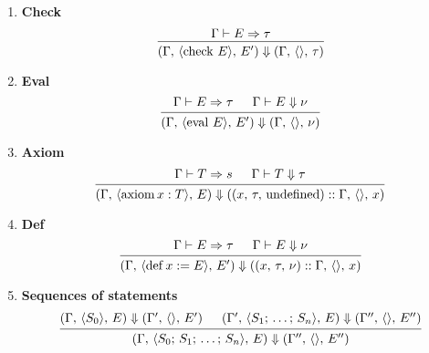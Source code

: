 \documentclass{article}
\begin{document}
\begin{enumerate}
\item \textbf{Check} \\
  \[
    \begin{prooftree}
      \hypo{\Gamma \vdash E \Rightarrow \tau}
      \infer1{(\Gamma, \, \langle \checkk \, E \rangle, \, E') \Downarrow
        (\Gamma, \, \langle \rangle, \, \tau)}
    \end{prooftree}
  \]

\item \textbf{Eval} \\
  \[
    \begin{prooftree}
      \hypo{\Gamma \vdash E \Rightarrow \tau}
      \hypo{\Gamma \vdash E \Downarrow \nu}
      \infer2{(\Gamma, \, \langle \evall \, E \rangle, \, E') \Downarrow
        (\Gamma, \, \langle \rangle, \, \nu)}
    \end{prooftree}
  \]

\item \textbf{Axiom} \\
  \[
    \begin{prooftree}
      \hypo{\Gamma \vdash T \Rightarrow s}
      \hypo{\Gamma \vdash T \Downarrow \tau}
      \infer2{(\Gamma, \, \langle \axiom x : T \rangle, \, E) \Downarrow
        ((x, \, \tau, \, \text{undefined}) :: \Gamma, \, \langle \rangle, \, x)}
    \end{prooftree}
  \]

\item \textbf{Def} \\
  \[
    \begin{prooftree}
      \hypo{\Gamma \vdash E \Rightarrow \tau}
      \hypo{\Gamma \vdash E \Downarrow \nu}
      \infer2{(\Gamma, \, \langle \deff x := E \rangle, \, E') \Downarrow
        ((x, \, \tau, \, \nu) :: \Gamma, \, \langle \rangle, \, x)}
    \end{prooftree}
  \]

\item \textbf{Sequences of statements} \\
  \[
    \begin{prooftree}
      \hypo{(\Gamma, \, \langle S_0 \rangle, \, E) \Downarrow
        (\Gamma', \, \langle \rangle, \, E') }
      \hypo{(\Gamma', \, \langle S_1; \, \dots; \, S_n \rangle, \, E) \Downarrow
        (\Gamma'', \, \langle \rangle, \, E'') }
      \infer2{(\Gamma, \, \langle S_0; \, S_1; \, \dots; \, S_n \rangle, \, E) \Downarrow
        (\Gamma'', \, \langle \rangle, \, E'') }
    \end{prooftree}
  \]

\end{enumerate}
\end{document}

